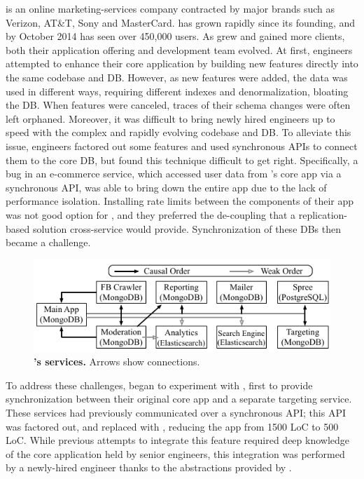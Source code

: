 \crowdtap is an online marketing-services company contracted by major brands such as Verizon, AT\&T, Sony and MasterCard.
\crowdtap has grown rapidly since its founding, and by October 2014 has seen over 450,000 users.
As \crowdtap grew and gained more clients, both their application offering and development team evolved.
At first, engineers attempted to enhance their core application by building new features directly into the same codebase and DB.
However, as new features were added, the data was used in different ways, requiring different indexes and denormalization, bloating the DB.
When features were canceled, traces of their schema changes were often left orphaned.
Moreover, it was difficult to bring newly hired engineers up to speed with the complex and rapidly evolving codebase and DB.
To alleviate this issue, engineers factored out some features and used synchronous APIs to connect them to the core DB, but found this technique difficult to
get right.
Specifically, a bug in an e-commerce service, which accessed user data from
\crowdtap's core app via a synchronous API, was able to bring down the entire app due to
the lack of performance isolation.  Installing rate limits between the components
of their app was not good option for \crowdtap, and they preferred the
de-coupling that a replication-based solution cross-service would provide.
Synchronization of these DBs then became a challenge.

\begin{figure}[t]
  \centering
  \includegraphics[width=\linewidth]{figures/synapse/eco-crowdtap.pdf}
  \caption{\textbf{\crowdtap's services.} Arrows show \synapse connections.}
  \label{fig:crowdtap-ecosystem}
\end{figure}

To address these challenges, \crowdtap began to experiment with \synapse,
first to provide synchronization between their original core app and a separate
targeting service.  These services had previously communicated over a
synchronous API; this API was factored out, and replaced with \synapse,
reducing the app from 1500 LoC to 500 LoC.  While previous attempts to integrate
this feature required deep knowledge of the core application held by senior
engineers, this integration was performed by a newly-hired engineer thanks to the abstractions provided by \synapse.

